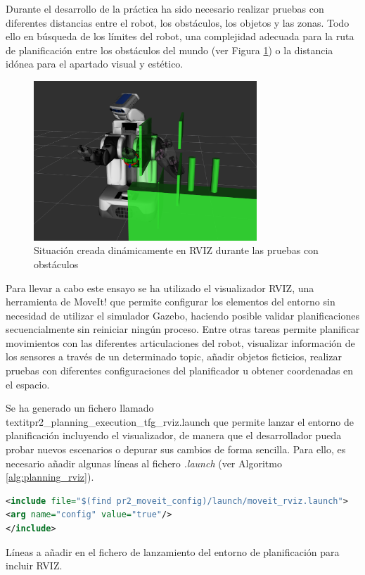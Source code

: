 \documentclass[12pt,spanish,chapterprefix, numbers=noenddot]{book}
\numberwithin{equation}{section}
\numberwithin{figure}{section}
\begin{document}
Durante el desarrollo de la práctica ha sido necesario realizar pruebas con diferentes distancias entre el robot, los obstáculos, los objetos y las zonas. Todo ello en búsqueda de los límites del robot, una complejidad adecuada para la ruta de planificación entre los obstáculos del mundo (ver Figura \ref{fig:rviz}) o la distancia idónea para el apartado visual y estético. 

\begin{figure}[hbt!]
\centering
\includegraphics[height=6cm]{Figs/RVIZ.png}
\par
\caption{\label{fig:rviz}Situación creada dinámicamente en RVIZ durante las pruebas con obstáculos}
\end{figure}

Para llevar a cabo este ensayo se ha utilizado el visualizador RVIZ, una herramienta de MoveIt! que permite configurar los elementos del entorno sin necesidad de utilizar el simulador Gazebo, haciendo posible validar planificaciones secuencialmente sin reiniciar ningún proceso. Entre otras tareas permite planificar movimientos con las diferentes articulaciones del robot, visualizar información de los sensores a través de un determinado topic, añadir objetos ficticios, realizar pruebas con diferentes configuraciones del planificador u obtener coordenadas en el espacio. 

Se ha generado un fichero llamado textit{pr2\_planning\_execution\_tfg\_rviz.launch} que permite lanzar el entorno de planificación incluyendo el visualizador, de manera que el desarrollador pueda probar nuevos escenarios o depurar sus cambios de forma sencilla. Para ello, es necesario añadir algunas líneas al fichero \textit{.launch} (ver Algoritmo \ref{alg:planning_rviz}).  %

\begin{algorithm}[htb!]
	\begin{lstlisting}[breaklines=true,language=xml] 
<include file="$(find pr2_moveit_config)/launch/moveit_rviz.launch">
<arg name="config" value="true"/>
</include>
	\end{lstlisting}
\caption{\label{alg:planning_rviz}Líneas a añadir en el fichero de lanzamiento del entorno de planificación para incluir RVIZ.}
\end{algorithm}
\end{document}
